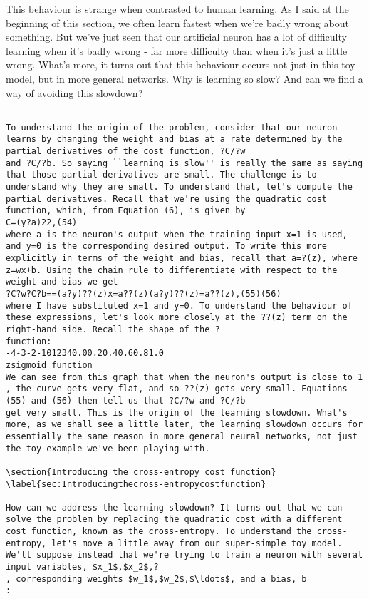 This behaviour is strange when contrasted to human learning. As I said at the beginning of this section, we often learn fastest when we're badly wrong about something. But we've just seen that our artificial neuron has a lot of difficulty learning when it's badly wrong - far more difficulty than when it's just a little wrong. What's more, it turns out that this behaviour occurs not just in this toy model, but in more general networks. Why is learning so slow? And can we find a way of avoiding this slowdown?
\begin{lstlisting}

To understand the origin of the problem, consider that our neuron learns by changing the weight and bias at a rate determined by the partial derivatives of the cost function, ?C/?w
and ?C/?b. So saying ``learning is slow'' is really the same as saying that those partial derivatives are small. The challenge is to understand why they are small. To understand that, let's compute the partial derivatives. Recall that we're using the quadratic cost function, which, from Equation (6), is given by 
C=(y?a)22,(54)
where a is the neuron's output when the training input x=1 is used, and y=0 is the corresponding desired output. To write this more explicitly in terms of the weight and bias, recall that a=?(z), where z=wx+b. Using the chain rule to differentiate with respect to the weight and bias we get 
?C?w?C?b==(a?y)??(z)x=a??(z)(a?y)??(z)=a??(z),(55)(56)
where I have substituted x=1 and y=0. To understand the behaviour of these expressions, let's look more closely at the ??(z) term on the right-hand side. Recall the shape of the ?
function:
-4-3-2-1012340.00.20.40.60.81.0
zsigmoid function
We can see from this graph that when the neuron's output is close to 1
, the curve gets very flat, and so ??(z) gets very small. Equations (55) and (56) then tell us that ?C/?w and ?C/?b
get very small. This is the origin of the learning slowdown. What's more, as we shall see a little later, the learning slowdown occurs for essentially the same reason in more general neural networks, not just the toy example we've been playing with.

\section{Introducing the cross-entropy cost function}
\label{sec:Introducingthecross-entropycostfunction}

How can we address the learning slowdown? It turns out that we can solve the problem by replacing the quadratic cost with a different cost function, known as the cross-entropy. To understand the cross-entropy, let's move a little away from our super-simple toy model. We'll suppose instead that we're trying to train a neuron with several input variables, $x_1$,$x_2$,?
, corresponding weights $w_1$,$w_2$,$\ldots$, and a bias, b
: 


\end{lstlisting}
